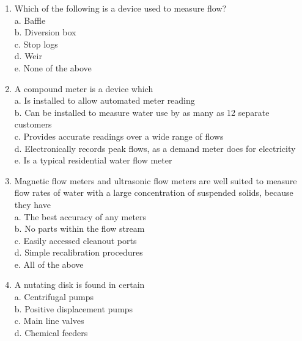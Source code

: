 \begin{enumerate}[1.]
  \item Which of the following is a device used to measure flow?\\
a. Baffle\\
b. Diversion box\\
c. Stop logs\\
d. Weir\\
e. None of the above 

\item A compound meter is a device which\\
a. Is installed to allow automated meter reading\\

b. Can be installed to measure water use by as many as 12 separate customers\\

c. Provides accurate readings over a wide range of flows\\

d. Electronically records peak flows, as a demand meter does for electricity\\

e. Is a typical residential water flow meter\\

\item Magnetic flow meters and ultrasonic flow meters are well suited to measure flow rates of water with a large concentration of suspended solids, because they have\\


a. The best accuracy of any meters\\

b. No parts within the flow stream\\

c. Easily accessed cleanout ports\\

d. Simple recalibration procedures\\

e. All of the above\\

\item A nutating disk is found in certain\\
a. Centrifugal pumps\\

b. Positive displacement pumps\\

c. Main line valves\\

d. Chemical feeders\\


\end{enumerate}
